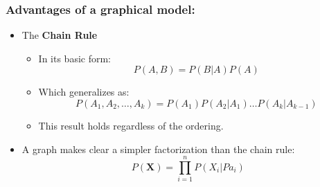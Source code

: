 \documentclass[10pt,containsverbatim,paralist]{article}
\begin{document}
\subsubsection*{Advantages of a graphical model:}
\label{sec-1-1-3}
\begin{itemize}
\item The \textbf{Chain Rule}
\label{sec-1-1-3-1}
\begin{itemize}
\item In its basic form:
\label{sec-1-1-3-1-1}
$$P(A,B) = P(B|A)P(A)$$
\item Which generalizes as:
\label{sec-1-1-3-1-2}
$$P(A_1,A_2,\ldots,A_k)=P(A_1)P(A_2|A_1)\ldots P(A_k|A_{k-1})$$
\item This result holds regardless of the ordering.
\label{sec-1-1-3-1-3}
\end{itemize}
\item A graph makes clear a simpler factorization than the chain rule:
\label{sec-1-1-3-2}
$$P(\mathbf{X})=\prod_{i=1}^n P(X_i|Pa_i)$$
\end{itemize}
\end{document}
